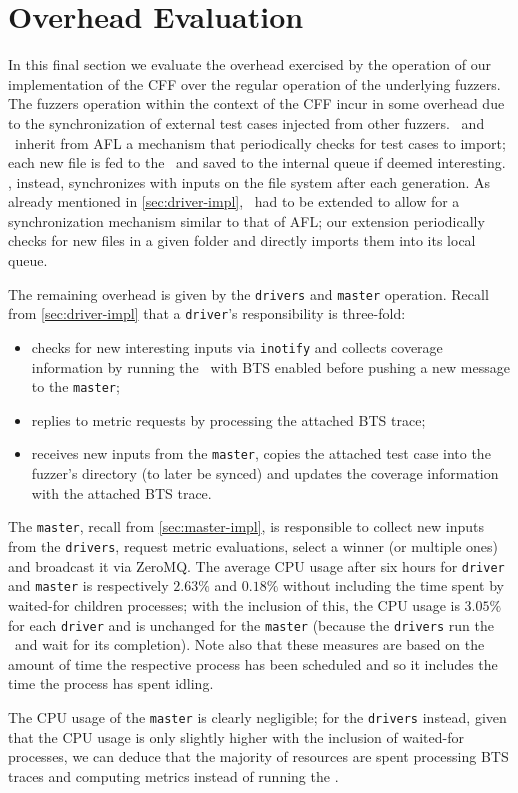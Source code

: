 \section{Overhead Evaluation}
\label{sec:overhead}

In this final section we evaluate the overhead exercised by the operation of our
implementation of the \ac{CFF} over the regular operation of the underlying
fuzzers. The fuzzers operation within the context of the \ac{CFF} incur in some
overhead due to the synchronization of external test cases injected from other
fuzzers. \aflfast\ and \fairfuzz\ inherit from AFL a mechanism that periodically
checks for test cases to import; each new file is fed to the \sut\ and saved to
the internal queue if deemed interesting. \vuzzer, instead, synchronizes with
inputs on the file system after each generation. As already mentioned in
\autoref{sec:driver-impl}, \honggfuzz\ had to be extended to allow for a
synchronization mechanism similar to that of AFL; our extension periodically
checks for new files in a given folder and directly imports them into its local
queue.

The remaining overhead is given by the \texttt{drivers} and \texttt{master}
operation. Recall from \autoref{sec:driver-impl} that a \texttt{driver}'s
responsibility is three-fold:

\begin{itemize}
    \item checks for new interesting inputs via \texttt{inotify} and collects
        coverage information by running the \sut\ with \ac{BTS} enabled before
        pushing a new message to the \texttt{master};
    \item replies to metric requests by processing the attached \ac{BTS} trace;
    \item receives new inputs from the \texttt{master}, copies the attached
        test case into the fuzzer's directory (to later be synced) and updates
        the coverage information with the attached \ac{BTS} trace.
\end{itemize}

The \texttt{master}, recall from \autoref{sec:master-impl}, is responsible to
collect new inputs from the \texttt{drivers}, request metric evaluations, select
a winner (or multiple ones) and broadcast it via ZeroMQ\@. The average CPU usage
after six hours for \texttt{driver} and \texttt{master} is respectively $2.63\%$
and $0.18\%$ without including the time spent by waited-for children processes;
with the inclusion of this, the CPU usage is $3.05\%$ for each \texttt{driver}
and is unchanged for the \texttt{master} (because the \texttt{drivers} run the
\sut\ and wait for its completion). Note also that these measures are based on
the amount of time the respective process has been scheduled and so it includes
the time the process has spent idling.

The CPU usage of the \texttt{master} is clearly negligible; for the
\texttt{drivers} instead, given that the CPU usage is only slightly higher with
the inclusion of waited-for processes, we can deduce that the majority of
resources are spent processing \ac{BTS} traces and computing metrics instead of
running the \sut.

